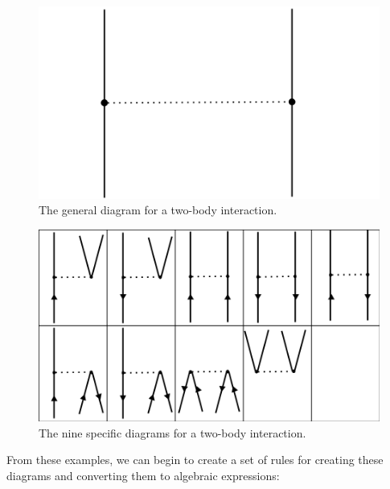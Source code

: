 \begin{figure}
    \centering
    \includegraphics[scale=0.25]{Images/Chapter2/two_body_generic.png}
    \caption{The general diagram for a two-body interaction.}
    \label{fig:two_body_general}
\end{figure}

\begin{figure}
    \centering
    \includegraphics[scale=0.25]{Images/Chapter2/two_body_specific.png}
    \caption{The nine specific diagrams for a two-body interaction.}
    \label{fig:two_body_specific}
\end{figure}

From these examples, we can begin to create a set of rules for creating these diagrams and converting them to algebraic expressions:

